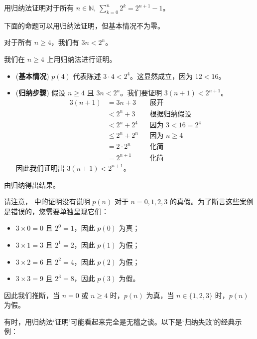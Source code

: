 \begin{exercise}
\label{exSumOfPowersOf2}
用归纳法证明对于所有 $n \in \mathbb{N}$, $\displaystyle \sum_{k=0}^n 2^k = 2^{n+1} - 1$。
\end{exercise}

下面的命题可以用归纳法证明，但基本情况不为零。

\begin{proposition}
\label{propWeakInductionNonzeroBaseCaseExample}
对于所有 $n \ge 4$，我们有 $3n < 2^n$。
\end{proposition}

\begin{cproof}
我们在 $n \ge 4$ 上用归纳法进行证明。
\begin{itemize}
\item (\textbf{基本情况}) $p(4)$ 代表陈述 $3 \cdot 4 < 2^4$。这显然成立，因为 $12 < 16$。

\item (\textbf{归纳步骤}) 假设 $n \ge 4$ 且 $3n < 2^n$。我们要证明 $3(n+1) < 2^{n+1}$。
\begin{align*}
3(n+1) &= 3n+3 && \text{展开} \\
&< 2^n + 3   && \text{根据归纳假设} \\
&< 2^n + 2^4 && \text{因为 $3 < 16 = 2^4$} \\
&\le 2^n + 2^n && \text{因为 $n \ge 4$} \\
&= 2 \cdot 2^n && \text{化简} \\
&= 2^{n+1} && \text{化简}
\end{align*}
因此我们证明出 $3(n+1) < 2^{n+1}$。
\end{itemize}
由归纳得出结果。
\end{cproof}

请注意， 中的证明没有说明 $p(n)$ 对于 $n=0,1,2,3$ 的真假。为了断言这些案例是错误的，您需要单独呈现它们：
\begin{itemize}
\item $3 \times 0 = 0$ 且 $2^0 = 1$，因此 $p(0)$ 为真；
\item $3 \times 1 = 3$ 且 $2^1 = 2$，因此 $p(1)$ 为假；
\item $3 \times 2 = 6$ 且 $2^2 = 4$，因此 $p(2)$ 为假；
\item $3 \times 3 = 9$ 且 $2^3 = 8$，因此 $p(3)$ 为假。
\end{itemize}
因此我们推断，当 $n=0$ 或 $n \ge 4$ 时，$p(n)$ 为真，当 $n \in \{ 1, 2, 3 \}$ 时，$p(n)$ 为假。

有时，用归纳法`证明'可能看起来完全是无稽之谈。以下是`归纳失败'的经典示例：

